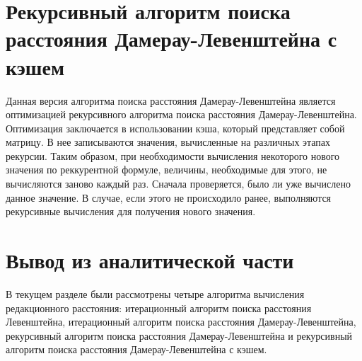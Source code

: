 \section{Рекурсивный алгоритм поиска расстояния Дамерау-Левенштейна с кэшем}

Данная версия алгоритма поиска расстояния Дамерау-Левенштейна является оптимизацией рекурсивного алгоритма поиска расстояния Дамерау-Левенштейна. 
Оптимизация заключается в использовании кэша, который представляет собой матрицу. 
В нее записываются значения, вычисленные на различных этапах рекурсии. 
Таким образом, при необходимости вычисления некоторого нового значения по реккурентной формуле, величины, необходимые для этого, не вычисляются заново каждый раз. 
Сначала проверяется, было ли уже вычислено данное значение. 
В случае, если этого не происходило ранее, выполняются рекурсивные вычисления для получения нового значения.

\section*{Вывод из аналитической части}

В текущем разделе были рассмотрены четыре алгоритма вычисления редакционного расстояния: итерационный алгоритм поиска расстояния Левенштейна, итерационный алгоритм поиска расстояния Дамерау-Левенштейна, рекурсивный алгоритм поиска расстояния Дамерау-Левенштейна и рекурсивный алгоритм поиска расстояния Дамерау-Левенштейна с кэшем.

